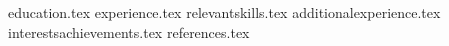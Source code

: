 \documentclass[11pt, a4paper]{awesome-cv}
\newcommand*{\sectiondir}{resume/}
\begin{document}
\makecvheader

{education.tex}
{experience.tex}
{relevantskills.tex}
{additionalexperience.tex}
{interestsachievements.tex}
{references.tex}
\end{document}
